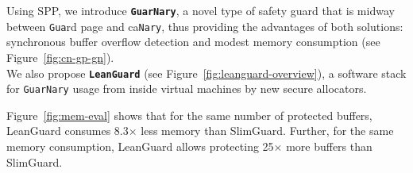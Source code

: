 \documentclass[landscape,a0paper,fontscale=0.3]{baposter} %
\begin{document}
\begin{poster}
{\begin{multicols}{2}
    \end{multicols}
}



{
    \begin{multicols}{2}
        \renewcommand{\section}[2]{\vskip 0.05em} %
        \nocite{*} %
        \scriptsize{ %
        
        }
    \end{multicols}
}


{
    \begin{multicols}{2}      

        Using SPP, we introduce \textbf{\texttt{GuarNary}}, a novel type of safety guard that is midway between \texttt{Gua}rd page and ca\texttt{Nary}, thus providing the advantages of both solutions: synchronous buffer overflow detection and modest memory consumption (see Figure~\ref{fig:cn-gp-gn}).\\
        We also propose \textbf{\texttt{LeanGuard}} (see Figure~\ref{fig:leanguard-overview}), a software stack for \texttt{GuarNary} usage from inside virtual machines by new secure allocators.

        Figure~\ref{fig:mem-eval} shows that for the same number of protected buffers, LeanGuard consumes 8.3$\times$ less memory than SlimGuard. Further, for the same memory consumption, LeanGuard allows protecting 25$\times$ more buffers than SlimGuard.


\end{multicols}}
\end{poster}
\end{document}
